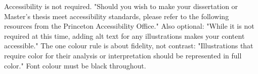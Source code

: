 
%

	{Accessibility is not required. "Should you wish to make your dissertation
	 or Master's thesis meet accessibility standards, please refer to the
	 following resources from the Princeton Accessibility Office."}
	{Also optional: "While it is not required at this time, adding alt text for
	 any illustrations makes your content accessible."}
	{The one colour rule is about fidelity, not contrast: "Illustrations that
	 require color for their analysis or interpretation should be represented in
	 full color." Font colour must be black throughout.}

%
%
%
\providecommand{\thesisdepartmentline}{THE DEPARTMENT OF}

